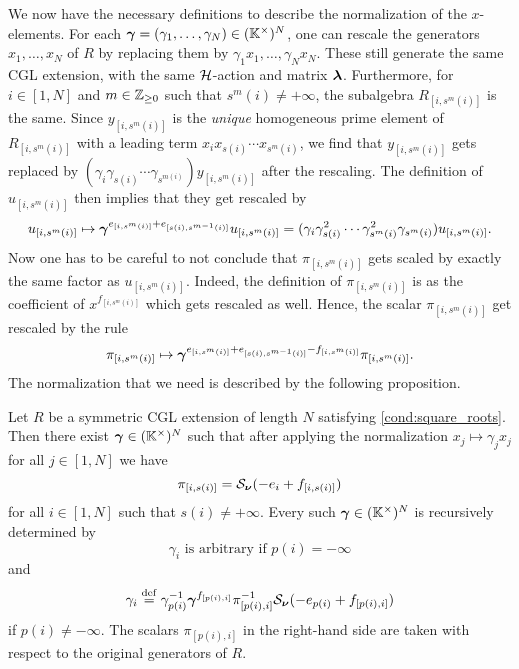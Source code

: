 We now have the necessary definitions to describe the normalization of the
$x$-elements. For each $\boldsymbol{\gamma} = (\gamma_1, \dots, \gamma_N) \in (\mathbb{K}^\times)^N$, one
can rescale the generators $x_1, \dots, x_N$ of $R$ by replacing them by $\gamma_1 x_1,
	\dots, \gamma_N x_N$. These still generate the same CGL extension, with the same
$\mathcal{H}$-action and matrix $\boldsymbol{\lambda}$. Furthermore, for $i \in [1, N]$ and $m \in \mathbb{Z}_{\geq
		0}$ such that $s^m(i) \neq + \infty$, the subalgebra $R_{[i, s^m(i)]}$ is the same.
Since $y_{[i, s^m(i)]}$ is the \emph{unique} homogeneous prime element of $R_{[i,
					s^m(i)]}$ with a leading term $x_i x_{s(i)} \cdots x_{s^m(i)}$, we find that $y_{[i,
					s^m(i)]}$ gets replaced by $(\gamma_i \gamma_{s(i)} \cdots \gamma_{s^{m(i)}})y_{[i,
					s^m(i)]}$ after the rescaling. The definition of $u_{[i, s^m(i)]}$ then implies that
they get rescaled by
\begin{equation*}
	u_{[i, s^m(i)]} \mapsto \boldsymbol{\gamma}^{e_{[i, s^m(i)]} + e_{[s(i), s^{m-1}(i)]} }u_{[i, s^m(i)]} =  (\gamma_i \gamma_{s(i)}^2 \cdots \gamma_{s^m(i)}^2 \gamma_{s^m(i)})u_{[i, s^m(i)]}.
\end{equation*}
%
Now one has to be careful to not conclude that $\pi_{[i, s^m(i)]}$ gets scaled by
exactly the same factor as $u_{[i, s^m(i)]}$. Indeed, the definition of $\pi_{[i,
				s^m(i)]}$ is as the coefficient of $x^{f_{[i, s^m(i)]}}$ which gets rescaled as well.
Hence, the scalar $\pi_{[i, s^m(i)]}$ get rescaled by the rule
\begin{equation*}
	\pi_{[i, s^m(i)]} \mapsto \boldsymbol{\gamma}^{e_{[i, s^m(i)]}+e_{[s(i), s^{m-1}(i)]} - f_{[i, s^m(i)]}}\pi_{[i, s^m(i)]}.
\end{equation*}
%
The normalization that we need is described by the following proposition.
\begin{proposition}

	Let $R$ be a symmetric CGL extension of length $N$ satisfying \cref{cond:square_roots}.
	Then there exist $\boldsymbol{\gamma} \in (\mathbb{K}^\times)^N$ such that after applying the normalization
	$x_j \mapsto \gamma_j x_j$ for all $j \in [1, N]$ we have
	\begin{equation}\label{eq:rescaling_conditions_for_pi}
		\pi_{[i, s(i)]} = \mathcal{S}_{\boldsymbol{\nu}}(-e_i + f_{[i, s(i)]})
	\end{equation}
	for all $i \in [1, N]$ such that $s(i) \neq + \infty$. Every such $\boldsymbol{\gamma} \in
		(\mathbb{K}^\times)^N$ is recursively determined by
	\begin{equation*}
		\gamma_i \text{ is arbitrary if } p(i) = -\infty
	\end{equation*}
	and
	\begin{equation*}
		\gamma_i \overset{\mathrm{def}}{=} \gamma_{p(i)}^{-1} \boldsymbol{\gamma}^{f_{[p(i),i]}}\pi^{-1}_{[p(i), i]}\mathcal{S}_{\boldsymbol{\nu}}(-e_{p(i)} + f_{[p(i), i]})
	\end{equation*}
	if $p(i) \neq -\infty$. The scalars $\pi_{[p(i), i]}$ in the right-hand side are taken with respect to the original generators of $R$.
\end{proposition}
